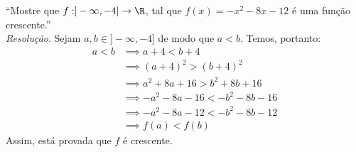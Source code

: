 \enquote{Mostre que $f: ]-\infty, -4] \rightarrow \R$, tal que $f(x) = -x^2 -8x - 12$ é uma função crescente.} \\
\emph{Resolução}. Sejam $a, b \in ]-\infty, -4]$ de modo que $a < b$. Temos, portanto:
\begin{align*}
    a < b & \implies a + 4 < b + 4 \\ & \implies
    (a + 4)^2 > (b + 4)^2 \\ & \implies
    a^2 + 8a + 16 > b^2 + 8b + 16 \\ & \implies
    -a^2 - 8a - 16 < -b^2 - 8b - 16 \\ & \implies
    -a^2 - 8a - 12 < -b^2 - 8b - 12\\ & \implies
    f(a) < f(b)
\end{align*}
Assim, está provada que $f$ é crescente.